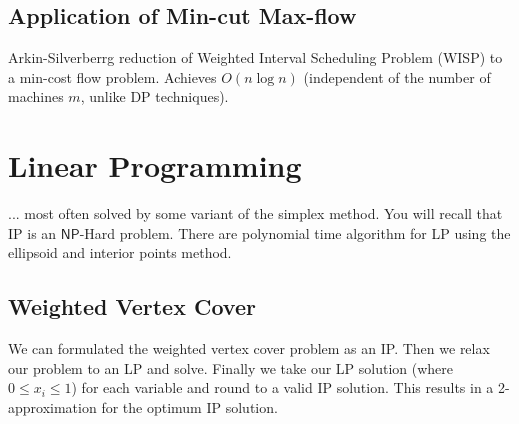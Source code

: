\documentclass[twoside]{article}
\newcommand\NP{\mathsf{NP}}
\begin{document}
\subsection{Application of Min-cut Max-flow}
Arkin-Silverberrg reduction of Weighted Interval Scheduling Problem (WISP) to a min-cost flow problem. Achieves $O(n\log n)$ (independent of the number of machines $m$, unlike DP techniques). 


\section{Linear Programming}
... most often solved by some variant of the simplex method. You will recall that IP is an $\NP$-Hard problem. There are polynomial time algorithm for LP using the ellipsoid and interior points method.

\subsection{Weighted Vertex Cover}
We can formulated the weighted vertex cover problem as an IP. Then we relax our problem to an LP and solve. Finally we take our LP solution (where $0 \leq x_i \leq 1$) for each variable and round to a valid IP solution. This results in a 2-approximation for the optimum IP solution.
\end{document}
